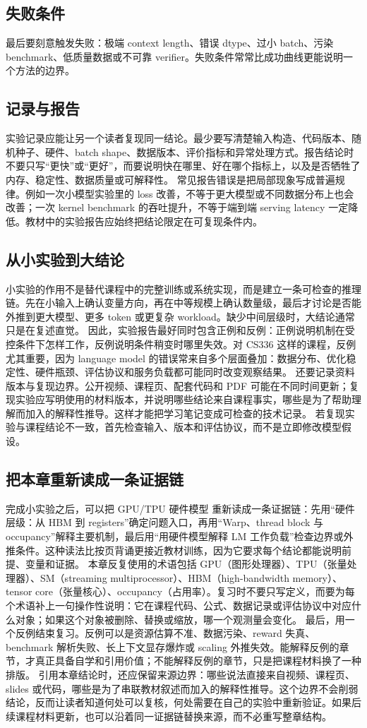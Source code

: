 \documentclass[a4paper]{article}
\begin{document}
\subsection{失败条件}
最后要刻意触发失败：极端 context length、错误 dtype、过小 batch、污染 benchmark、低质量数据或不可靠 verifier。失败条件常常比成功曲线更能说明一个方法的边界。
\subsection{记录与报告}
实验记录应能让另一个读者复现同一结论。最少要写清楚输入构造、代码版本、随机种子、硬件、batch shape、数据版本、评价指标和异常处理方式。报告结论时不要只写“更快”或“更好”，而要说明快在哪里、好在哪个指标上，以及是否牺牲了内存、稳定性、数据质量或可解释性。
常见报告错误是把局部现象写成普遍规律。例如一次小模型实验里的 loss 改善，不等于更大模型或不同数据分布上也会改善；一次 kernel benchmark 的吞吐提升，不等于端到端 serving latency 一定降低。教材中的实验报告应始终把结论限定在可复现条件内。
\subsection{从小实验到大结论}
小实验的作用不是替代课程中的完整训练或系统实现，而是建立一条可检查的推理链。先在小输入上确认变量方向，再在中等规模上确认数量级，最后才讨论是否能外推到更大模型、更多 token 或更复杂 workload。缺少中间层级时，大结论通常只是在复述直觉。
因此，实验报告最好同时包含正例和反例：正例说明机制在受控条件下怎样工作，反例说明条件稍变时哪里失效。对 CS336 这样的课程，反例尤其重要，因为 language model 的错误常来自多个层面叠加：数据分布、优化稳定性、硬件瓶颈、评估协议和服务负载都可能同时改变观察结果。
还要记录资料版本与复现边界。公开视频、课程页、配套代码和 PDF 可能在不同时间更新；复现实验应写明使用的材料版本，并说明哪些结论来自课程事实，哪些是为了帮助理解而加入的解释性推导。这样才能把学习笔记变成可检查的技术记录。
若复现实验与课程结论不一致，首先检查输入、版本和评估协议，而不是立即修改模型假设。
\subsection{把本章重新读成一条证据链}
完成小实验之后，可以把 GPU/TPU 硬件模型 重新读成一条证据链：先用“硬件层级：从 HBM 到 registers”确定问题入口，再用“Warp、thread block 与 occupancy”解释主要机制，最后用“用硬件模型解释 LM 工作负载”检查边界或外推条件。这种读法比按页背诵更接近教材训练，因为它要求每个结论都能说明前提、变量和证据。
本章反复使用的术语包括 GPU（图形处理器）、TPU（张量处理器）、SM（streaming multiprocessor）、HBM（high-bandwidth memory）、tensor core（张量核心）、occupancy（占用率）。复习时不要只写定义，而要为每个术语补上一句操作性说明：它在课程代码、公式、数据记录或评估协议中对应什么对象；如果这个对象被删除、替换或缩放，哪一个观测量会变化。
最后，用一个反例结束复习。反例可以是资源估算不准、数据污染、reward 失真、benchmark 解析失败、长上下文显存爆炸或 scaling 外推失效。能解释反例的章节，才真正具备自学和引用价值；不能解释反例的章节，只是把课程材料换了一种排版。
引用本章结论时，还应保留来源边界：哪些说法直接来自视频、课程页、slides 或代码，哪些是为了串联教材叙述而加入的解释性推导。这个边界不会削弱结论，反而让读者知道何处可以复核，何处需要在自己的实验中重新验证。如果后续课程材料更新，也可以沿着同一证据链替换来源，而不必重写整章结构。
\end{document}
